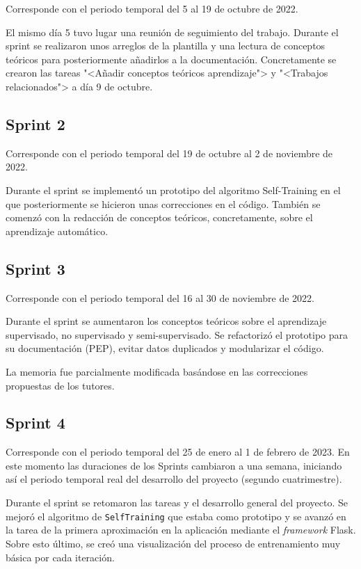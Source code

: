 Corresponde con el periodo temporal del 5 al 19 de octubre de 2022. 

El mismo día 5 tuvo lugar una reunión de seguimiento del trabajo. Durante el sprint se
realizaron unos arreglos de la plantilla y una lectura de conceptos teóricos
para posteriormente añadirlos a la documentación. Concretamente se crearon las
tareas "<Añadir conceptos teóricos aprendizaje"> y "<Trabajos relacionados"> a
día 9 de octubre.

\subsection{Sprint 2}

Corresponde con el periodo temporal del 19 de octubre al 2 de noviembre de 2022. 

Durante el sprint se implementó un prototipo del algoritmo Self-Training en el
que posteriormente se hicieron unas correcciones en el código. También se
comenzó con la redacción de conceptos teóricos, concretamente, sobre el
aprendizaje automático.

\subsection{Sprint 3}

Corresponde con el periodo temporal del 16 al 30 de noviembre de 2022.

Durante el sprint se aumentaron los conceptos teóricos sobre el aprendizaje
supervisado, no supervisado y semi-supervisado. Se refactorizó el prototipo para
su documentación (PEP), evitar datos duplicados y modularizar el código.

La memoria fue parcialmente modificada basándose en las correcciones propuestas
de los tutores.

\subsection{Sprint 4}

Corresponde con el periodo temporal del 25 de enero al 1 de febrero de 2023. En
este momento las duraciones de los Sprints cambiaron a una semana, iniciando así
el periodo temporal real del desarrollo del proyecto (segundo cuatrimestre).

Durante el sprint se retomaron las tareas y el desarrollo general del proyecto.
Se mejoró el algoritmo de \texttt{SelfTraining} que estaba como prototipo y se
avanzó en la tarea de la primera aproximación en la aplicación mediante el
\textit{framework} Flask. Sobre esto último, se creó una visualización del
proceso de entrenamiento muy básica por cada iteración.

